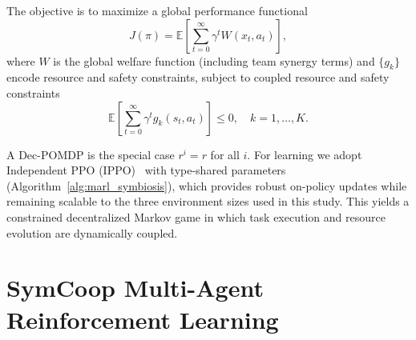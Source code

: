 \documentclass[Afour,sageh,times]{sagej}
\begin{document}
The objective is to maximize a global performance functional
\begin{equation}
    J(\pi) = 
    \mathbb{E}\!\left[
        \sum_{t=0}^{\infty} 
        \gamma^t 
        W(x_t,a_t)
    \right],
\end{equation}
where $W$ is the global welfare function (including team synergy terms) and $\{g_k\}$ encode resource and safety constraints, subject to coupled resource and safety constraints
\begin{equation}
    \mathbb{E}\!\left[
        \sum_{t=0}^{\infty} 
        \gamma^t 
        g_k(s_t,a_t)
    \right] \le 0,
    \quad k=1,\dots,K.
\end{equation}

A Dec-POMDP is the special case $r^i = r$ for all $i$. For learning we adopt Independent PPO (IPPO)~\citep{yu2022Surprising} with type-shared parameters (Algorithm~\ref{alg:marl_symbiosis}), which provides robust on-policy updates while remaining scalable to the three environment sizes used in this study. This yields a constrained decentralized Markov game in which task execution and resource evolution are dynamically coupled.





% 

\section{SymCoop Multi-Agent Reinforcement Learning}
\label{sec:method}
\end{document}
